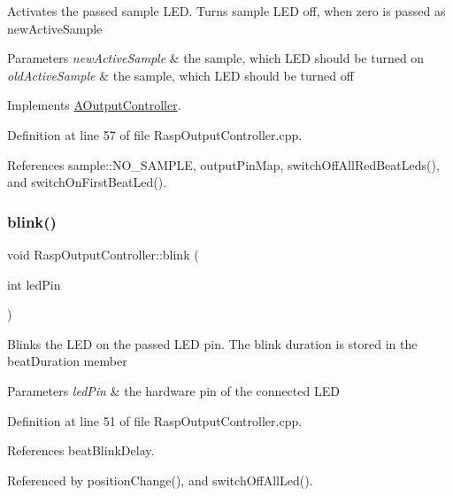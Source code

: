 Activates the passed sample L\+ED. Turns sample L\+ED off, when zero is passed as new\+Active\+Sample 
\begin{DoxyParams}{Parameters}
{\em new\+Active\+Sample} & the sample, which L\+ED should be turned on \\
\hline
{\em old\+Active\+Sample} & the sample, which L\+ED should be turned off \\
\hline
\end{DoxyParams}


Implements \hyperlink{class_a_output_controller_ac2b87aa6291c38cc65185bf6a37ae300}{A\+Output\+Controller}.



Definition at line 57 of file Rasp\+Output\+Controller.\+cpp.



References sample\+::\+N\+O\+\_\+\+S\+A\+M\+P\+LE, output\+Pin\+Map, switch\+Off\+All\+Red\+Beat\+Leds(), and switch\+On\+First\+Beat\+Led().

\mbox{\label{class_rasp_output_controller_a23987d33142c3c09abf8126773f32d99}} 
\subsubsection{\texorpdfstring{blink()}{blink()}}
{\footnotesize\ttfamily void Rasp\+Output\+Controller\+::blink (\begin{DoxyParamCaption}\item[{int}]{led\+Pin }\end{DoxyParamCaption})}

Blinks the L\+ED on the passed L\+ED pin. The blink duration is stored in the beat\+Duration member 
\begin{DoxyParams}{Parameters}
{\em led\+Pin} & the hardware pin of the connected L\+ED \\
\hline
\end{DoxyParams}


Definition at line 51 of file Rasp\+Output\+Controller.\+cpp.



References beat\+Blink\+Delay.



Referenced by position\+Change(), and switch\+Off\+All\+Led().

\mbox{\label{class_rasp_output_controller_a1172c2966777bbcee89cbe4e6de027d5}} 
